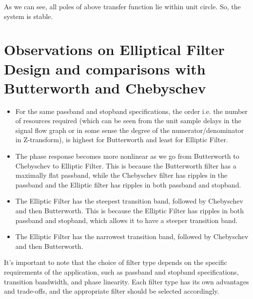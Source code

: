 \documentclass{article}
\begin{document}
As we can see, all poles of above transfer function lie within unit circle. So, the system is stable.

\section{Observations on Elliptical Filter Design and comparisons with Butterworth and Chebyschev}

\begin{itemize}
    \item For the same passband and stopband specifications, the order i.e. the number of resources required (which can be seen from the unit sample delays in the signal flow graph or in some sense the degree of the numerator/denominator in Z-transform), is highest for Butterworth and least for Elliptic Filter.
    \item The phase response becomes more nonlinear as we go from Butterworth to Chebyschev to Elliptic Filter. This is because the Butterworth filter has a maximally flat passband, while the Chebyschev filter has ripples in the passband and the Elliptic filter has ripples in both passband and stopband.
    \item The Elliptic Filter has the steepest transition band, followed by Chebyschev and then Butterworth. This is because the Elliptic Filter has ripples in both passband and stopband, which allows it to have a steeper transition band.
    \item The Elliptic Filter has the narrowest transition band, followed by Chebyschev and then Butterworth.
    
\end{itemize}

It's important to note that the choice of filter type depends on the specific requirements of the application, such as passband and stopband specifications, transition bandwidth, and phase linearity. Each filter type has its own advantages and trade-offs, and the appropriate filter should be selected accordingly.
\end{document}
